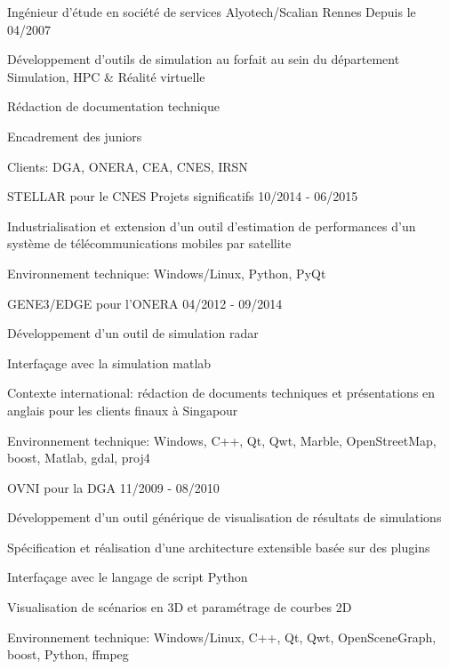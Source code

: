 \begin{cventries}
  \cventry
    {Ingénieur d'étude en société de services}
    {Alyotech/Scalian}
    {Rennes}
    {Depuis le 04/2007}
    {
      \begin{cvitems}
        \item {Développement d'outils de simulation au forfait au sein du
            département Simulation, HPC \& Réalité virtuelle}
        \item {Rédaction de documentation technique}
        \item {Encadrement des juniors}
        \item {Clients: DGA, ONERA, CEA, CNES, IRSN}
      \end{cvitems}
    }

  \cventry
    {STELLAR pour le CNES}
    {Projets significatifs}
    {}
    {10/2014 - 06/2015}
    {
      \begin{cvitems}
        \item {Industrialisation et extension d’un outil d’estimation de
            performances d’un système de télécommunications mobiles par
            satellite}
        \item {Environnement technique: Windows/Linux, Python, PyQt}
      \end{cvitems}
    }

  \cventry
    {GENE3/EDGE pour l'ONERA}
    {}
    {}
    {04/2012 - 09/2014}
    {
      \begin{cvitems}
        \item {Développement d’un outil de simulation radar}
        \item {Interfaçage avec la simulation matlab}
        \item {Contexte international: rédaction de documents techniques et
            présentations en anglais pour les clients finaux à Singapour}
        \item {Environnement technique: Windows, C++, Qt, Qwt, Marble,
            OpenStreetMap, boost, Matlab, gdal, proj4}
      \end{cvitems}
    }

  \cventry
    {OVNI pour la DGA}
    {}
    {}
    {11/2009 - 08/2010}
    {
      \begin{cvitems}
        \item {Développement d'un outil générique de visualisation de résultats
            de simulations}
        \item {Spécification et réalisation d'une architecture extensible basée
            sur des plugins}
        \item {Interfaçage avec le langage de script Python}
        \item {Visualisation de scénarios en 3D et paramétrage de courbes 2D}
        \item {Environnement technique: Windows/Linux, C++, Qt, Qwt,
            OpenSceneGraph, boost, Python, ffmpeg}
      \end{cvitems}
    }


\end{cventries}
